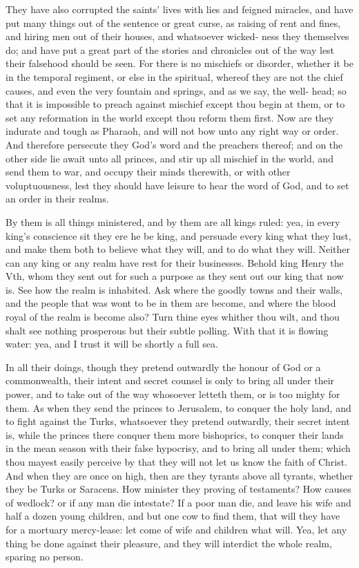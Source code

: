 \documentclass{custom}
\begin{document}
They have also corrupted the saints' lives with lies and 
feigned miracles, and have put many things out of the 
sentence or great curse, as raising of rent and fines, and 
hiring men out of their houses, and whatsoever wicked- 
ness they themselves do; and have put a great part of the 
stories and chronicles out of the way lest their falsehood 
should be seen. For there is no mischiefs or disorder, 
whether it be in the temporal regiment, or else in the 
spiritual, whereof they are not the chief causes, and even 
the very fountain and springs, and as we say, the well- 
head; so that it is impossible to preach against mischief 
except thou begin at them, or to set any reformation in 
the world except thou reform them first. Now are they 
indurate and tough as Pharaoh, and will not bow unto 
any right way or order. And therefore persecute they 
God's word and the preachers thereof; and on the other 
side lie await unto all princes, and stir up all mischief in 
the world, and send them to war, and occupy their minds 
therewith, or with other voluptuousness, lest they should 
have leisure to hear the word of God, and to set an order 
in their realms. 

By them is all things ministered, and by them are all 
kings ruled: yea, in every king's conscience sit they ere 
he be king, and persuade every king what they lust, and 
make them both to believe what they will, and to do what 
they will. Neither can any king or any realm have rest for 
their businesses. Behold king Henry the Vth, whom they 
sent out for such a purpose as they sent out our king that 
now is. See how the realm is inhabited. Ask where the 
goodly towns and their walls, and the people that was 
wont to be in them are become, and where the blood 
royal of the realm is become also? Turn thine eyes 
whither thou wilt, and thou shalt see nothing prosperous 
but their subtle polling. With that it is flowing water: 
yea, and I trust it will be shortly a full sea. 

In all their doings, though they pretend outwardly the 
honour of God or a commonwealth, their intent and 
secret counsel is only to bring all under their power, and 
to take out of the way whosoever letteth them, or is too 
mighty for them. As when they send the princes to 
Jerusalem, to conquer the holy land, and to fight against 
the Turks, whatsoever they pretend outwardly, their 
secret intent is, while the princes there conquer them more 
bishoprics, to conquer their lands in the mean season with 
their false hypocrisy, and to bring all under them; which 
thou mayest easily perceive by that they will not let us 
know the faith of Christ. And when they are once on 
high, then are they tyrants above all tyrants, whether they 
be Turks or Saracens. How minister they proving of 
testaments? How causes of wedlock? or if any man 
die intestate? If a poor man die, and leave his wife 
and half a dozen young children, and but one cow to find 
them, that will they have for a mortuary mercy-lease: let 
come of wife and children what will. Yea, let any thing 
be done against their pleasure, and they will interdict the 
whole realm, sparing no person. 
\end{document}
